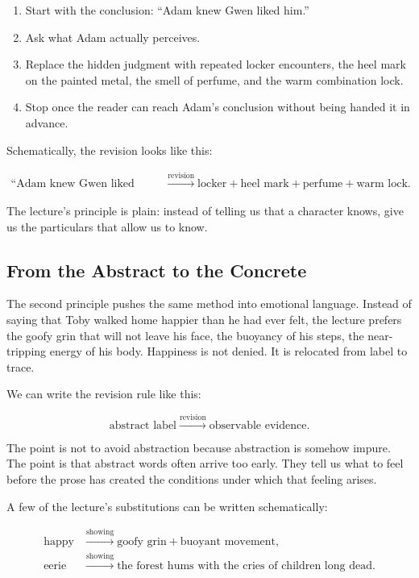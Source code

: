 \begin{enumerate}
\item Start with the conclusion: ``Adam knew Gwen liked him.''
\item Ask what Adam actually perceives.
\item Replace the hidden judgment with repeated locker encounters, the heel mark on the painted metal, the smell of perfume, and the warm combination lock.
\item Stop once the reader can reach Adam's conclusion without being handed it in advance.
\end{enumerate}

Schematically, the revision looks like this:

\begin{align}
\text{``Adam knew Gwen liked him''}
&\xrightarrow{\text{revision}}
\text{locker} + \text{heel mark} + \text{perfume} + \text{warm lock}.
\end{align}

The lecture's principle is plain: instead of telling us that a character knows, give us the particulars that allow us to know.

\subsection{From the Abstract to the Concrete}

The second principle pushes the same method into emotional language. Instead of saying that Toby walked home happier than he had ever felt, the lecture prefers the goofy grin that will not leave his face, the buoyancy of his steps, the near-tripping energy of his body. Happiness is not denied. It is relocated from label to trace.

We can write the revision rule like this:

\begin{equation}
\text{abstract label} \xrightarrow{\text{revision}} \text{observable evidence}.
\end{equation}

The point is not to avoid abstraction because abstraction is somehow impure. The point is that abstract words often arrive too early. They tell us what to feel before the prose has created the conditions under which that feeling arises.

A few of the lecture's substitutions can be written schematically:

\begin{align}
\text{happy} &\xrightarrow{\text{showing}} \text{goofy grin} + \text{buoyant movement},\\
\text{eerie} &\xrightarrow{\text{showing}} \text{the forest hums with the cries of children long dead}.
\end{align}

